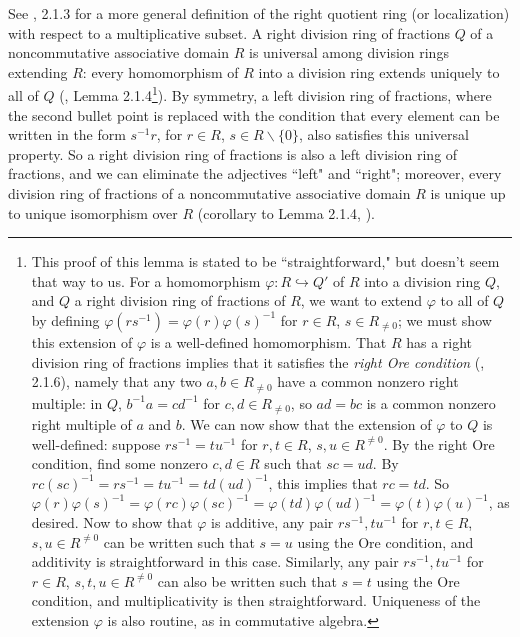 \documentclass{amsart}
\theoremstyle{definition}
\theoremstyle{remark}
\numberwithin{equation}{section}
\begin{document}
See \cite{mcconnell1987noncommutative}, 2.1.3 for a more general definition of the right quotient ring (or localization) with respect to a multiplicative subset. A right division ring of fractions $Q$ of a noncommutative associative domain $R$ is universal among division rings extending $R$: every homomorphism of $R$ into a division ring extends uniquely to all of $Q$ (\cite{mcconnell1987noncommutative}, Lemma 2.1.4\footnote{This proof of this lemma is stated to be ``straightforward," but doesn't seem that way to us. For a homomorphism $\varphi: R \hookrightarrow Q'$ of $R$ into a division ring $Q$, and $Q$ a right division ring of fractions of $R$, we want to extend $\varphi$ to all of $Q$ by defining $\varphi(rs^{-1})=\varphi(r)\varphi(s)^{-1}$ for $r \in R$, $s \in R_{\neq 0}$; we must show this extension of $\varphi$ is a well-defined homomorphism. That $R$ has a right division ring of fractions implies that it satisfies the \textit{right Ore condition} (\cite{mcconnell1987noncommutative}, 2.1.6), namely that any two $a, b \in R_{\neq 0}$ have a common nonzero right multiple: in $Q$, $b^{-1}a = cd^{-1}$ for $c, d \in R_{\neq0}$, so $ad = bc$ is a common nonzero right multiple of $a$ and $b$. We can now show that the extension of $\varphi$ to $Q$ is well-defined: suppose $rs^{-1} = tu^{-1}$ for $r, t \in R$, $s, u \in R^{\neq 0}$. By the right Ore condition, find some nonzero $c, d \in R$ such that $sc = ud$. By $rc (sc)^{-1}=rs^{-1} = tu^{-1}= td(ud)^{-1}$, this implies that $rc=td$. So $\varphi(r)\varphi(s)^{-1} = \varphi(rc)\varphi(sc)^{-1}= \varphi(td)\varphi(ud)^{-1}=\varphi(t)\varphi(u)^{-1}$, as desired. Now to show that $\varphi$ is additive, any pair $rs^{-1}, tu^{-1}$ for $r, t \in R$, $s, u \in R^{\neq 0}$ can be written such that $s = u$ using the Ore condition, and additivity is straightforward in this case. Similarly, any pair $rs^{-1}, tu^{-1}$ for $r \in R$, $s, t, u \in R^{\neq 0}$ can also be written such that $s = t$ using the Ore condition, and multiplicativity is then straightforward. Uniqueness of the extension $\varphi$ is also routine, as in commutative algebra.}). By symmetry, a left division ring of fractions, where the second bullet point is replaced with the condition that every element can be written in the form $s^{-1}r$, for $r \in R$, $s \in R \backslash \{0\}$, also satisfies this universal property. So a right division ring of fractions is also a left division ring of fractions, and we can eliminate the adjectives ``left" and ``right"; moreover, every division ring of fractions of a noncommutative associative domain $R$ is unique up to unique isomorphism over $R$ (corollary to Lemma 2.1.4, \cite{mcconnell1987noncommutative}).
\end{document}
